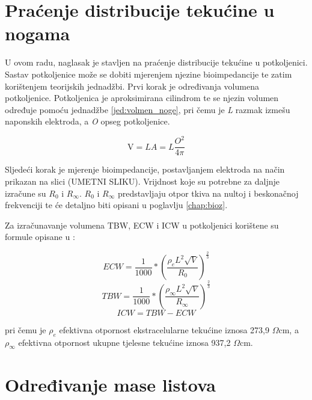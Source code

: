\documentclass[../diplomski_rad.tex]{subfiles}
\begin{document}
\section{Praćenje distribucije tekućine u nogama}

U ovom radu, naglasak je stavljen na praćenje distribucije tekućine u potkoljenici. 
Sastav potkoljenice može se dobiti mjerenjem njezine bioimpedancije te zatim korištenjem teorijskih jednadžbi. 
Prvi korak je određivanja volumena potkoljenice. 
Potkoljenica je aproksimirana cilindrom te se njezin volumen određuje pomoću jednadžbe \ref{jed:volmen_noge}, 
pri čemu je \textit{L} razmak izmešu naponskih elektroda, a \textit{O} opseg potkoljenice.

\begin{equation}
    \label{jed:volmen_noge}
    \mathrm{V}=L A=L \frac{O^2}{4 \pi}
\end{equation} 

Sljedeći korak je mjerenje bioimpedancije, postavljanjem elektroda na način prikazan na slici (UMETNI SLIKU). 
Vrijdnost koje su potrebne za daljnje izračune su $R_{0}$ i $R_{\infty}$.
$R_{0}$ i $R_{\infty}$ predstavljaju otpor tkiva na nultoj i beskonačnoj frekvenciji te će detaljno biti opisani u poglavlju \ref{chap:bioz}.

Za izračunavanje volumena TBW, ECW i ICW u potkoljenici korištene su formule opisane u \cite{Delano2022}:

\begin{equation}
    \label{jed:ecw_noge}
    ECW=\frac{1}{1000} *\left(\frac{\rho_e L^2 \sqrt{V}}{R_0}\right)^{\frac{2}{3}}
\end{equation} 
\begin{equation}
    \label{jed:tbw_noge}
    TBW=\frac{1}{1000} *\left(\frac{\rho_{\infty} L^2 \sqrt{V}}{R_{\infty}}\right)^{\frac{2}{3}}
\end{equation} 
\begin{equation}
    \label{jed:icw_noge}
    ICW=TBW-ECW 
\end{equation} 

pri čemu je $\rho_{e}$ efektivna otpornost ekstracelularne tekućine iznosa 273,9 $\Omega$cm, a 
$\rho_{\infty}$ efektivna otpornost ukupne tjelesne tekućine iznosa 937,2 $\Omega$cm.

\section{Određivanje mase listova}
\end{document}
